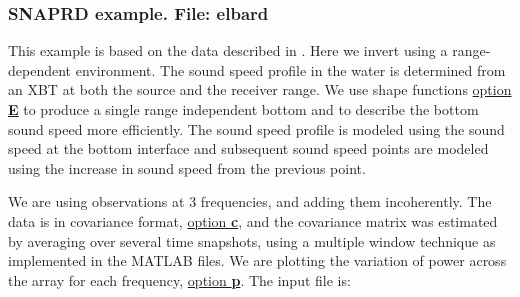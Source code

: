 \documentclass{saclantc}
\begin{document}
\subsubsection{SNAPRD example. File: {\bf elbard}}
\label{se:elbard}
This example is based on the data described in 
\cite{gingras:asa95,gerstoft:asa96}. Here we
invert using a  range-dependent environment. The sound speed profile in the water
is determined from an XBT at both the source and the receiver range. We use shape
functions \underline{option {\bf E}} to produce a single range independent
bottom and to describe the bottom sound speed more efficiently.
The sound speed profile is modeled using the sound speed at the bottom
interface and subsequent sound speed points are modeled using the
increase in sound speed from the previous point.

We are using observations at
3 frequencies, and adding them incoherently. The data is in
covariance format, \underline{option {\bf c}}, and the
covariance matrix was estimated by averaging over several time
snapshots, using a multiple window technique \cite{thompson:icassp94,meckl:icassp95} as implemented in
the MATLAB files. 
We are plotting the
variation of power across the array for each frequency,
 \underline{option {\bf p}}. The input file is:
\end{document}
